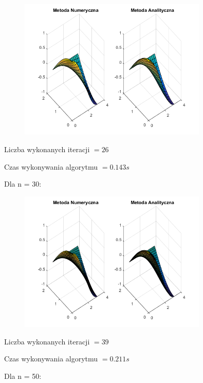 \begin{figure}[!ht]
	\begin{center}
		\includegraphics[width=0.8\textwidth]{Lab6/charts/pr/zad2/15.png}
	\end{center}
\end{figure}

Liczba wykonanych iteracji $ = 26 $

Czas wykonywania algorytmu $ = 0.143 s$

Dla n = 30:

\begin{figure}[!ht]
	\begin{center}
		\includegraphics[width=0.8\textwidth]{Lab6/charts/pr/zad2/30.png}
	\end{center}
\end{figure}

Liczba wykonanych iteracji $ = 39 $

Czas wykonywania algorytmu $ = 0.211 s$



Dla n = 50:

